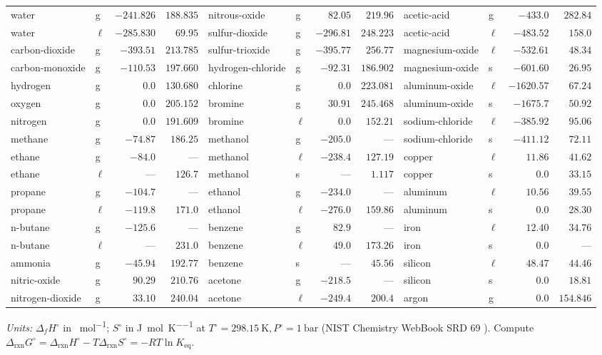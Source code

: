 {\begin{tabularx}{\linewidth}{@{}X l r r | X l r r | X l r r@{}}
water & g & $-241.826$ & $188.835$ & nitrous-oxide & g & $82.05$ & $219.96$ & acetic-acid & g & $-433.0$ & $282.84$\\
water & $\ell$ & $-285.830$ & $69.95$ & sulfur-dioxide & g & $-296.81$ & $248.223$ & acetic-acid & $\ell$ & $-483.52$ & $158.0$\\
carbon-dioxide & g & $-393.51$ & $213.785$ & sulfur-trioxide & g & $-395.77$ & $256.77$ & magnesium-oxide & $\ell$ & $-532.61$ & $48.34$\\
carbon-monoxide & g & $-110.53$ & $197.660$ & hydrogen-chloride & g & $-92.31$ & $186.902$ & magnesium-oxide & s & $-601.60$ & $26.95$\\
hydrogen & g & $0.0$ & $130.680$ & chlorine & g & $0.0$ & $223.081$ & aluminum-oxide & $\ell$ & $-1620.57$ & $67.24$\\
oxygen & g & $0.0$ & $205.152$ & bromine & g & $30.91$ & $245.468$ & aluminum-oxide & s & $-1675.7$ & $50.92$\\
nitrogen & g & $0.0$ & $191.609$ & bromine & $\ell$ & $0.0$ & $152.21$ & sodium-chloride & $\ell$ & $-385.92$ & $95.06$\\
methane & g & $-74.87$ & $186.25$ & methanol & g & $-205.0$ & --- & sodium-chloride & s & $-411.12$ & $72.11$\\
ethane & g & $-84.0$ & --- & methanol & $\ell$ & $-238.4$ & $127.19$ & copper & $\ell$ & $11.86$ & $41.62$\\
ethane & $\ell$ & --- & $126.7$ & methanol & s & --- & $1.117$ & copper & s & $0.0$ & $33.15$\\
propane & g & $-104.7$ & --- & ethanol & g & $-234.0$ & --- & aluminum & $\ell$ & $10.56$ & $39.55$\\
propane & $\ell$ & $-119.8$ & $171.0$ & ethanol & $\ell$ & $-276.0$ & $159.86$ & aluminum & s & $0.0$ & $28.30$\\
n-butane & g & $-125.6$ & --- & benzene & g & $82.9$ & --- & iron & $\ell$ & $12.40$ & $34.76$\\
n-butane & $\ell$ & --- & $231.0$ & benzene & $\ell$ & $49.0$ & $173.26$ & iron & s & $0.0$ & ---\\
ammonia & g & $-45.94$ & $192.77$ & benzene & s & --- & $45.56$ & silicon & $\ell$ & $48.47$ & $44.46$\\
nitric-oxide & g & $90.29$ & $210.76$ & acetone & g & $-218.5$ & --- & silicon & s & $0.0$ & $18.81$\\
nitrogen-dioxide & g & $33.10$ & $240.04$ & acetone & $\ell$ & $-249.4$ & $200.4$ & argon & g & $0.0$ & $154.846$\\
\bottomrule
\end{tabularx}}
{\scriptsize\noindent\emph{Units:} $\Delta_f H^\circ$ in \si{\kilojoule\per\mole}; $S^\circ$ in \si{\joule\per\mole\per\kelvin} at $T^\circ = \SI{298.15}{\kelvin}, P^\circ = \SI{1}{\bar}$ (NIST Chemistry WebBook SRD 69 ). Compute $\Delta_{\mathrm{rxn}}G^\circ = \Delta_{\mathrm{rxn}}H^\circ - T\Delta_{\mathrm{rxn}}S^\circ = -RT\ln K_{\mathrm{eq}}$.}


